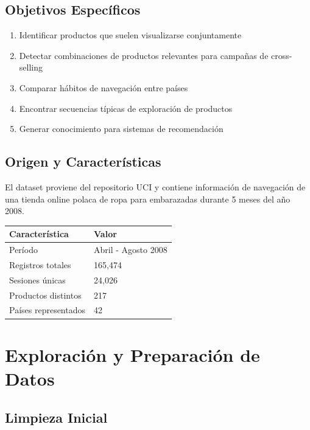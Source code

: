 \documentclass[
  11pt,
  letterpaper,
  DIV=11,
  numbers=noendperiod]{scrartcl}
\newcounter{none} %
\begin{document}
\subsection{Objetivos Específicos}\label{objetivos-especuxedficos}

\begin{enumerate}
\def\labelenumi{\arabic{enumi}.}
\item
  Identificar productos que suelen visualizarse conjuntamente
\item
  Detectar combinaciones de productos relevantes para campañas de
  cross-selling
\item
  Comparar hábitos de navegación entre países
\item
  Encontrar secuencias típicas de exploración de productos
\item
  Generar conocimiento para sistemas de recomendación
\end{enumerate}

\subsection{Origen y Características}\label{origen-y-caracteruxedsticas}

El dataset proviene del repositorio UCI y contiene información de
navegación de una tienda online polaca de ropa para embarazadas durante
5 meses del año 2008.

{\def\LTcaptype{none} %
\begin{longtable}[]{@{}ll@{}}
\toprule\noalign{}
Característica & Valor \\
\midrule\noalign{}
\endhead
\bottomrule\noalign{}
\endlastfoot
Período & Abril - Agosto 2008 \\
Registros totales & 165,474 \\
Sesiones únicas & 24,026 \\
Productos distintos & 217 \\
Países representados & 42 \\
\end{longtable}
}

\section{Exploración y Preparación de
Datos}\label{exploraciuxf3n-y-preparaciuxf3n-de-datos}

\subsection{Limpieza Inicial}\label{limpieza-inicial}
\end{document}
